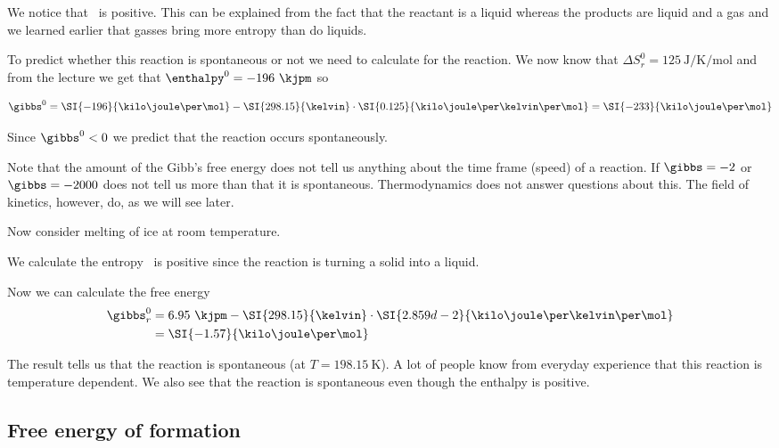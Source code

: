 \documentclass[../mit-general-chemistry.tex]{subfiles}
\begin{document}
We notice that \dS\ is positive. This can be explained from the fact
that the reactant is a liquid whereas the products are liquid and a
gas and we learned earlier that gasses bring more entropy than do
liquids.

To predict whether this reaction is spontaneous or not we need to
calculate \gibbs for the reaction. We now know that $\Delta S^0_r =
125~\si{\joule\per\kelvin\per\mol}$ and from the lecture we get that
$\enthalpy^0 = -196~\kjpm$ so

\begin{equation*}
  \gibbs^0 = \SI{-196}{\kilo\joule\per\mol}
  - \SI{298.15}{\kelvin}
  \cdot \SI{0.125}{\kilo\joule\per\kelvin\per\mol}
  = \SI{-233}{\kilo\joule\per\mol}
\end{equation*}

Since $\gibbs^0 < 0$ we predict that the reaction occurs
spontaneously.

Note that the amount of the Gibb's free energy does not tell us
anything about the time frame (speed) of a reaction. If $\gibbs = -2$
or $\gibbs = -2000$ does not tell us more than that it is
spontaneous. Thermodynamics does not answer questions about this. The
field of kinetics, however, do, as we will see later.

Now consider melting of ice at room temperature.

We calculate the entropy
\dS\ is positive since the reaction is turning a solid into a liquid.

Now we can calculate the free energy
\begin{align*}
  \gibbs_r^0 &= 6.95~\kjpm
  - \SI{298.15}{\kelvin}
  \cdot \SI{2.859d-2}{\kilo\joule\per\kelvin\per\mol} \\
  &= \SI{-1.57}{\kilo\joule\per\mol}\\
\end{align*}

The result tells us that the reaction is spontaneous (at $T =
\SI{198.15}{\kelvin}$). A lot of people know from everyday experience
that this reaction is temperature dependent. We also see that the
reaction is spontaneous even though the enthalpy is positive.




\subsection{Free energy of formation}
\end{document}
